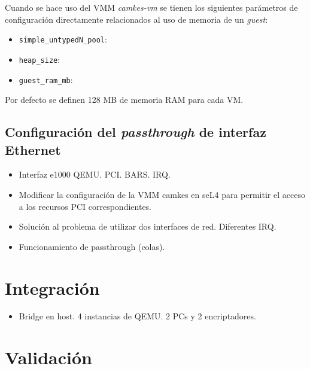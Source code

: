 Cuando se hace uso del VMM \textit{camkes-vm} se tienen los siguientes parámetros de configuración directamente relacionados al uso de memoria de un \textit{guest}:
\begin{itemize}
    \item \texttt{simple\_untypedN\_pool}: 
    \item \texttt{heap\_size}: 
    \item \texttt{guest\_ram\_mb}: 
\end{itemize}
Por defecto se definen 128 MB de memoria RAM para cada VM.


\subsection{Configuración del \textit{passthrough} de interfaz Ethernet}
\begin{itemize}
    \item Interfaz e1000 QEMU. PCI. BARS. IRQ.
    \item Modificar la configuración de la VMM camkes en seL4 para permitir el acceso a los recursos PCI correspondientes.
    \item Solución al problema de utilizar dos interfaces de red. Diferentes IRQ.
    \item Funcionamiento de passthrough (colas).
\end{itemize}

\section{Integración}
\begin{itemize}
    \item Bridge en host. 4 instancias de QEMU. 2 PCs y 2 encriptadores.
\end{itemize}

\section{Validación} %
